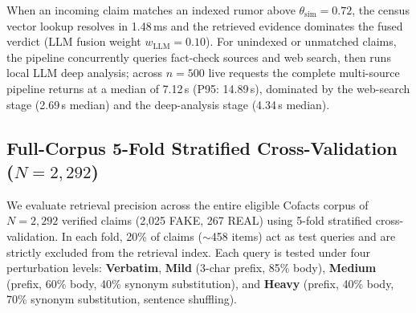 \documentclass[twoside]{llncs}
\begin{document}
When an incoming claim matches an indexed rumor above $\theta_{\text{sim}} = 0.72$, the census vector lookup resolves in 1.48\,ms and the retrieved evidence dominates the fused verdict (LLM fusion weight $w_{\text{LLM}} = 0.10$). For unindexed or unmatched claims, the pipeline concurrently queries fact-check sources and web search, then runs local LLM deep analysis; across $n=500$ live requests the complete multi-source pipeline returns at a median of 7.12\,s (P95: 14.89\,s), dominated by the web-search stage (2.69\,s median) and the deep-analysis stage (4.34\,s median).

\subsection{Full-Corpus 5-Fold Stratified Cross-Validation ($N{=}2{,}292$)}
\label{sec:retrieval}
We evaluate retrieval precision across the entire eligible Cofacts corpus of $N=2{,}292$ verified claims (2,025 FAKE, 267 REAL) using 5-fold stratified cross-validation. In each fold, 20\% of claims ($\sim$458 items) act as test queries and are strictly excluded from the retrieval index. Each query is tested under four perturbation levels: \textbf{Verbatim}, \textbf{Mild} (3-char prefix, 85\% body), \textbf{Medium} (prefix, 60\% body, 40\% synonym substitution), and \textbf{Heavy} (prefix, 40\% body, 70\% synonym substitution, sentence shuffling).
\end{document}
